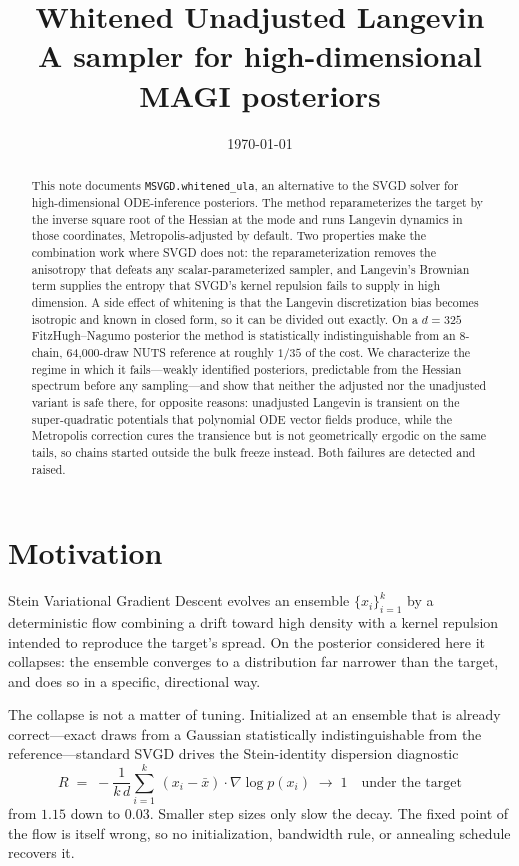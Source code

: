 \documentclass[11pt]{article}
\title{\bfseries Whitened Unadjusted Langevin\\[2pt]
\large A sampler for high-dimensional MAGI posteriors}
\author{}
\date{\today}
\newcommand{\code}[1]{\texttt{\small #1}}
\begin{document}
\maketitle

\begin{abstract}
\noindent
This note documents \code{MSVGD.whitened\_ula}, an alternative to the SVGD solver for
high-dimensional ODE-inference posteriors. The method reparameterizes the target by the inverse
square root of the Hessian at the mode and runs Langevin dynamics in those coordinates,
Metropolis-adjusted by default. Two
properties make the combination work where SVGD does not: the reparameterization removes the
anisotropy that defeats any scalar-parameterized sampler, and Langevin's Brownian term supplies
the entropy that SVGD's kernel repulsion fails to supply in high dimension. A side effect of
whitening is that the Langevin discretization bias becomes isotropic and known in closed form,
so it can be divided out exactly. On a $d=325$ FitzHugh--Nagumo posterior the method is
statistically indistinguishable from an 8-chain, 64{,}000-draw NUTS reference at roughly
$1/35$ of the cost. We characterize the regime in which it fails---weakly identified posteriors, predictable from
the Hessian spectrum before any sampling---and show that neither the adjusted nor the unadjusted
variant is safe there, for opposite reasons: unadjusted Langevin is transient on the
super-quadratic potentials that polynomial ODE vector fields produce, while the Metropolis
correction cures the transience but is not geometrically ergodic on the same tails, so chains
started outside the bulk freeze instead. Both failures are detected and raised.
\end{abstract}

\section{Motivation}

Stein Variational Gradient Descent evolves an ensemble $\{x_i\}_{i=1}^k$ by a deterministic flow
combining a drift toward high density with a kernel repulsion intended to reproduce the target's
spread. On the posterior considered here it collapses: the ensemble converges to a distribution
far narrower than the target, and does so in a specific, directional way.

The collapse is not a matter of tuning. Initialized at an ensemble that is already correct---exact
draws from a Gaussian statistically indistinguishable from the reference---standard SVGD drives
the Stein-identity dispersion diagnostic
\begin{equation}
  R \;=\; -\frac{1}{k\,d}\sum_{i=1}^{k}\,(x_i-\bar{x})\cdot\nabla\log p(x_i)
  \;\longrightarrow\; 1 \quad\text{under the target}
  \label{eq:steinR}
\end{equation}
from $1.15$ down to $0.03$. Smaller step sizes only slow the decay. The fixed point of the flow
is itself wrong, so no initialization, bandwidth rule, or annealing schedule recovers it.
\end{document}
